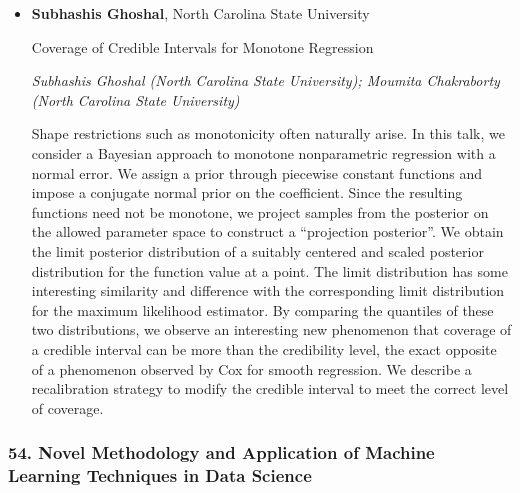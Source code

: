\begin{itemize}
\item \textbf{Subhashis Ghoshal}, North Carolina State University

Coverage of Credible Intervals for Monotone Regression

\emph{\footnotesize Subhashis Ghoshal (North Carolina State University); Moumita Chakraborty (North Carolina State University)}

Shape restrictions such as monotonicity often naturally arise. In this talk, we consider a Bayesian approach to monotone nonparametric regression with a normal error. We assign a prior through piecewise constant functions and impose a conjugate normal prior on the coefficient. Since the resulting functions need not be monotone, we project samples from the posterior on the allowed parameter space to construct a “projection posterior”. We obtain the limit posterior distribution of a suitably centered and scaled posterior distribution for the function value at a point. The limit distribution has some interesting similarity and difference with the corresponding limit distribution for the maximum likelihood estimator. By comparing the quantiles of these two distributions, we observe an interesting new phenomenon that coverage of a credible interval can be more than the credibility level, the exact opposite of a phenomenon observed by Cox for smooth regression. We describe a recalibration strategy to modify the credible interval to meet the correct level of coverage.

\end{itemize}

\subsubsection*{54. Novel Methodology and Application of Machine Learning Techniques in Data Science}

